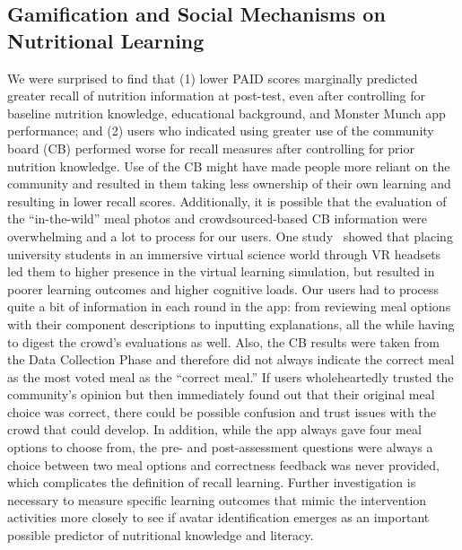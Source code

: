 \subsection{Gamification and Social Mechanisms on Nutritional Learning}
We were surprised to find that (1) lower PAID scores marginally predicted greater recall of nutrition information at post-test, even after controlling for baseline nutrition knowledge, educational background, and Monster Munch app performance; and (2) users who indicated using greater use of the community board (CB) performed worse for recall measures after controlling for prior nutrition knowledge.  
Use of the CB might have made people more reliant on the community and resulted in them taking less ownership of their own learning and resulting in lower recall scores. Additionally,
it is possible that the evaluation of the ``in-the-wild'' meal photos and crowdsourced-based CB information were overwhelming and a lot to process for our users. 
One study~\cite{makransky2019adding} showed that placing university students in an immersive virtual science world through VR headsets led them to higher presence in the virtual learning simulation, but resulted in poorer learning outcomes and higher cognitive loads. 
Our users had to process quite a bit of information in each round in the app: from reviewing meal options with their component descriptions to inputting explanations, all the while having to digest the crowd's evaluations as well. 
Also, the CB results were taken from the Data Collection Phase and therefore did not always indicate the correct meal as the most voted meal as the ``correct meal.'' If users wholeheartedly trusted the community's opinion but then immediately found out that their original meal choice was correct, there could be possible confusion and trust issues with the crowd that could develop. 
In addition, while the app always gave four meal options to choose from, the pre- and post-assessment questions were always a choice between two meal options and correctness feedback was never provided, which complicates the definition of recall learning. 
Further investigation is necessary to measure specific learning outcomes that mimic the intervention activities more closely to see if avatar identification emerges as an important possible predictor of nutritional knowledge and literacy.

